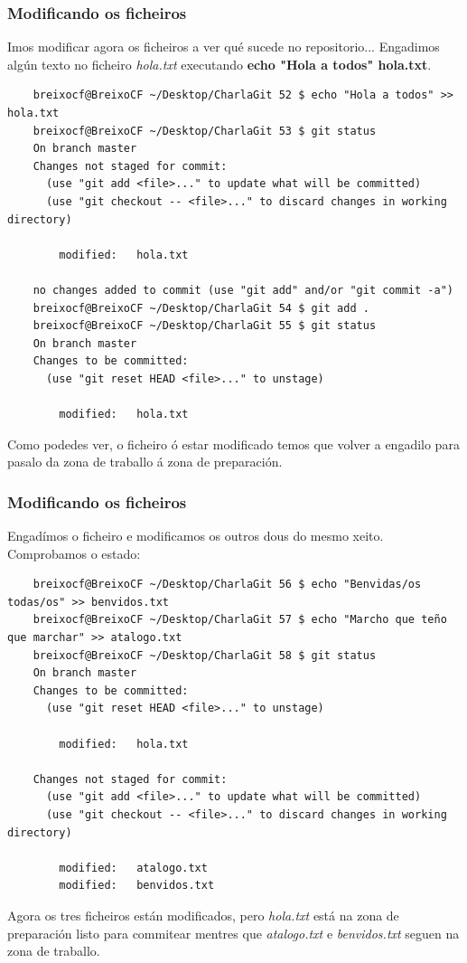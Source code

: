 \begin{frame}[fragile]
	\frametitle{Modificando os ficheiros}
	\scriptsize
	Imos modificar agora os ficheiros a ver qué sucede no repositorio... Engadimos algún texto no ficheiro \textit{hola.txt} executando \textbf{echo "Hola a todos" \guillemotright hola.txt}.
	\tiny 
	\begin{verbatim}
	breixocf@BreixoCF ~/Desktop/CharlaGit 52 $ echo "Hola a todos" >> hola.txt 
	breixocf@BreixoCF ~/Desktop/CharlaGit 53 $ git status
	On branch master
	Changes not staged for commit:
	  (use "git add <file>..." to update what will be committed)
	  (use "git checkout -- <file>..." to discard changes in working directory)
	
		modified:   hola.txt
	
	no changes added to commit (use "git add" and/or "git commit -a")
	breixocf@BreixoCF ~/Desktop/CharlaGit 54 $ git add .
	breixocf@BreixoCF ~/Desktop/CharlaGit 55 $ git status
	On branch master
	Changes to be committed:
	  (use "git reset HEAD <file>..." to unstage)
	
		modified:   hola.txt
	\end{verbatim}
	\scriptsize 
	Como podedes ver, o ficheiro ó estar modificado temos que volver a engadilo para pasalo da zona de traballo á zona de preparación.
\end{frame}

\begin{frame}[fragile]
	\frametitle{Modificando os ficheiros}
	\scriptsize
	Engadímos o ficheiro e modificamos os outros dous do mesmo xeito. Comprobamos o estado:
	\tiny 
	\begin{verbatim}
	breixocf@BreixoCF ~/Desktop/CharlaGit 56 $ echo "Benvidas/os todas/os" >> benvidos.txt
	breixocf@BreixoCF ~/Desktop/CharlaGit 57 $ echo "Marcho que teño que marchar" >> atalogo.txt
	breixocf@BreixoCF ~/Desktop/CharlaGit 58 $ git status
	On branch master
	Changes to be committed:
	  (use "git reset HEAD <file>..." to unstage)
	
		modified:   hola.txt
	
	Changes not staged for commit:
	  (use "git add <file>..." to update what will be committed)
	  (use "git checkout -- <file>..." to discard changes in working directory)
	
		modified:   atalogo.txt
		modified:   benvidos.txt
	\end{verbatim}
	\scriptsize 
	Agora os tres ficheiros están modificados, pero \textit{hola.txt} está na zona de preparación listo para commitear mentres que \textit{atalogo.txt} e \textit{benvidos.txt} seguen na zona de traballo.
\end{frame}

